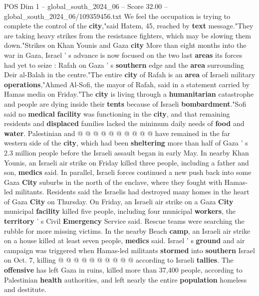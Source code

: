 \begin{textsample}{POS Dim 1 – global\_south\_2024\_06 – Score 32.00 – global\_south\_2024\_06/109359456.txt}
We feel the occupation is trying to complete the control of the \textbf{city},"said Hatem, 45, reached by \textbf{text} message."They are taking heavy strikes from the resistance fighters, which may be slowing them down."Strikes on Khan Younis and Gaza \textbf{city} More than eight months into the war in Gaza, Israel ' s advance is now focused on the two last \textbf{areas} its forces had yet to seize : Rafah on Gaza ' s \textbf{southern} edge and the \textbf{area} surrounding Deir al-Balah in the centre."The entire \textbf{city} of Rafah is an \textbf{area} of Israeli military \textbf{operations},"Ahmed Al-Sofi, the mayor of Rafah, said in a statement carried by Hamas media on Friday."The \textbf{city} is living through a \textbf{humanitarian} catastrophe and people are dying inside their \textbf{tents} because of Israeli \textbf{bombardment}."Sofi said no \textbf{medical} \textbf{facility} was functioning in the \textbf{city}, and that remaining residents and \textbf{displaced} families lacked the minimum daily needs of \textbf{food} and \textbf{water}.
Palestinian and @ @ @ @ @ @ @ @ @ @ have remained in the far western side of the \textbf{city}, which had been \textbf{sheltering} more than half of Gaza ' s 2.3 million people before the Israeli assault began in early May.
In nearby Khan Younis, an Israeli air strike on Friday killed three people, including a father and son, \textbf{medics} said.
In parallel, Israeli forces continued a new push back into some Gaza \textbf{City} suburbs in the north of the enclave, where they fought with Hamas-led militants.
Residents said the Israelis had destroyed many homes in the heart of Gaza \textbf{City} on Thursday.
On Friday, an Israeli air strike on a Gaza \textbf{City} municipal \textbf{facility} killed five people, including four municipal \textbf{workers}, the \textbf{territory} ' s Civil \textbf{Emergency} Service said.
Rescue teams were searching the rubble for more missing victims.
In the nearby Beach \textbf{camp}, an Israeli air strike on a house killed at least seven people, \textbf{medics} said.
Israel ' s \textbf{ground} and air campaign was triggered when Hamas-led militants \textbf{stormed} into \textbf{southern} Israel on Oct. 7, killing @ @ @ @ @ @ @ @ @ @ according to Israeli \textbf{tallies}.
The \textbf{offensive} has left Gaza in ruins, killed more than 37,400 people, according to Palestinian \textbf{health} authorities, and left nearly the entire \textbf{population} homeless and destitute.

\end{textsample}
